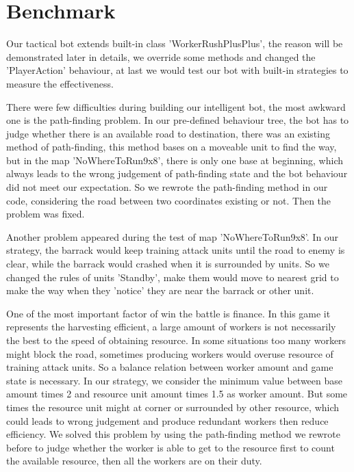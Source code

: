 \section{Benchmark}

Our tactical bot extends built-in class 'WorkerRushPlusPlus', the reason will be
demonstrated later in details, we override some methods and changed the 'PlayerAction'
behaviour, at last we would test our bot with built-in strategies to measure the effectiveness.

There were few difficulties during building our intelligent bot, the most awkward
one is the path-finding problem. In our pre-defined behaviour tree, the bot has to
judge whether there is an available road to destination, there was an existing method
of path-finding, this method bases on a moveable unit to find the way, but in the map
'NoWhereToRun9x8', there is only one base at beginning, which always leads to the wrong
judgement of path-finding state and the bot behaviour did not meet our expectation. So
we rewrote the path-finding method in our code, considering the road between two coordinates
existing or not. Then the problem was fixed.

Another problem appeared during the test of map 'NoWhereToRun9x8'. In our strategy, the
barrack would keep training attack units until the road to enemy is clear, while the
barrack would crashed when it is surrounded by units. So we changed the rules of units
'Standby', make them would move to nearest grid to make the way when they 'notice' they
are near the barrack or other unit.

One of the most important factor of win the battle is finance. In this game it represents
the harvesting efficient, a large amount of workers is not necessarily the best to the speed
of obtaining resource. In some situations too many workers might block the road, sometimes
producing workers would overuse resource of training attack units. So a balance relation
between worker amount and game state is necessary. In our strategy, we consider the minimum
value between base amount times 2 and resource unit amount times 1.5 as worker amount. But
some times the resource unit might at corner or surrounded by other resource, which could
leads to wrong judgement and produce redundant workers then reduce efficiency. We solved this
problem by using the path-finding method we rewrote before to judge whether the worker is able
to get to the resource first to count the available resource, then all the workers are on their
duty.
